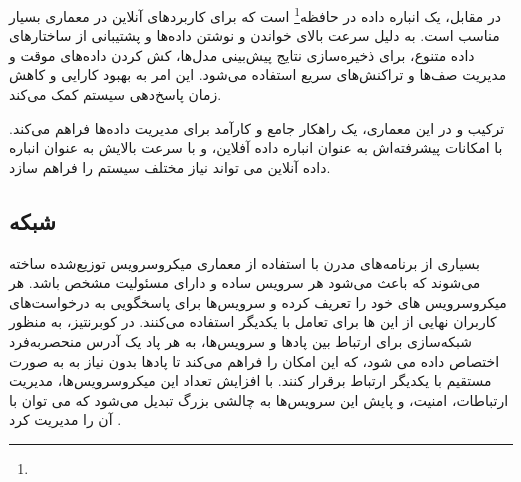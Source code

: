در مقابل،  یک انباره داده در حافظه\footnote{} است که برای کاربردهای آنلاین در معماری  بسیار مناسب است.  به دلیل سرعت بالای خواندن و نوشتن داده‌ها و پشتیبانی از ساختارهای داده متنوع، برای ذخیره‌سازی نتایج پیش‌بینی مدل‌ها، کش کردن داده‌های موقت و مدیریت صف‌ها و تراکنش‌های سریع استفاده می‌شود. این امر به بهبود کارایی و کاهش زمان پاسخ‌دهی سیستم کمک می‌کند.

ترکیب  و  در این معماری، یک راهکار جامع و کارآمد برای مدیریت داده‌ها فراهم می‌کند.  با امکانات پیشرفته‌اش به عنوان انباره داده آفلاین، و  با سرعت بالایش به عنوان انباره داده آنلاین می تواند نیاز مختلف سیستم را فراهم سازد.

\subsection{شبکه}
بسیاری از برنامه‌های مدرن با استفاده از معماری میکروسرویس توزیع‌شده ساخته می‌شوند که باعث می‌شود هر سرویس ساده و دارای مسئولیت مشخص باشد. هر میکروسرویس های خود را تعریف کرده و سرویس‌ها برای پاسخگویی به درخواست‌های کاربران نهایی از این ها برای تعامل با یکدیگر استفاده می‌کنند. در کوبرنتیز، به منظور شبکه‌سازی برای ارتباط بین پادها و سرویس‌ها، به هر پاد یک آدرس  منحصربه‌فرد اختصاص داده می شود، که این امکان را فراهم می‌کند تا پادها بدون نیاز به  به صورت مستقیم با یکدیگر ارتباط برقرار کنند. با افزایش تعداد این میکروسرویس‌ها، مدیریت ارتباطات، امنیت، و پایش این سرویس‌ها به چالشی بزرگ تبدیل می‌شود که می توان با  آن را مدیریت کرد \cite{Istio1}.

